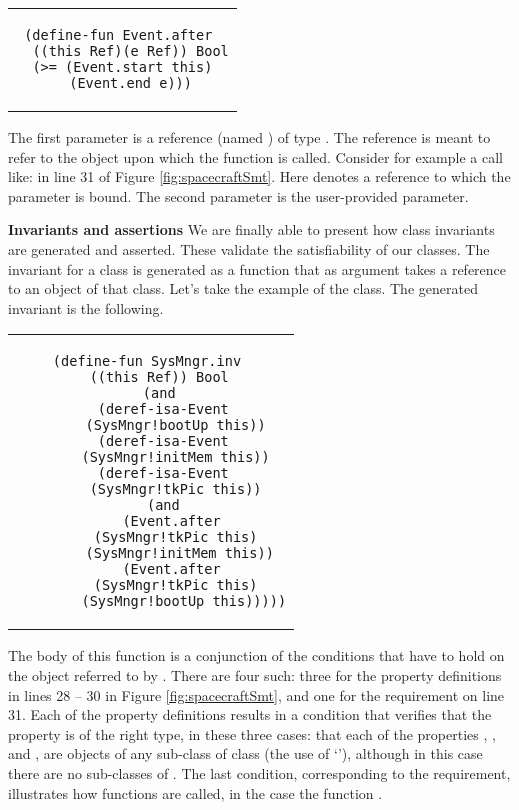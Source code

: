 \begin{center}
\begin{tabular}{c}
\small
\begin{lstlisting}
(define-fun Event.after 
  ((this Ref)(e Ref)) Bool
  (>= (Event.start this)  
  (Event.end e)))
\end{lstlisting}
\end{tabular}
\end{center}

\noindent The first parameter is a reference (named ) of
type . The  reference is meant to refer to the
object upon which the function is called. Consider for example a call
like:  in line 31 of Figure
\ref{fig:spacecraftSmt}. Here  denotes a reference
to which the parameter  is bound.  The second parameter is
the user-provided parameter.


\textbf{Invariants and assertions} We are finally able to present how
class invariants are generated and asserted. These validate the
satisfiability of our classes.  The invariant for a class is generated
as a function that as argument takes a  reference to an
object of that class. Let's take the example of the
 class. The generated invariant is the following.

\begin{center}
\begin{tabular}{c}
\small
\begin{lstlisting}
(define-fun SysMngr.inv 
  ((this Ref)) Bool
  (and
    (deref-isa-Event 
      (SysMngr!bootUp this))
    (deref-isa-Event 
      (SysMngr!initMem this))
    (deref-isa-Event 
      (SysMngr!tkPic this))
    (and 
      (Event.after 
        (SysMngr!tkPic this)  
        (SysMngr!initMem this)) 
      (Event.after 
        (SysMngr!tkPic this)  
        (SysMngr!bootUp this)))))
\end{lstlisting}
\end{tabular}
\end{center}

\noindent The body of this function is a conjunction of the conditions
that have to hold on the  object referred to by
. There are four such: three for the property definitions
in lines 28 -- 30 in Figure \ref{fig:spacecraftSmt}, and one for the
requirement on line 31. Each of the property definitions results in a
condition that verifies that the property is of the right type, in
these three cases: that each of the properties ,
, and , are objects of any sub-class of
class  (the use of `'), although in this case
there are no sub-classes of . The last condition,
corresponding to the requirement, illustrates how functions are called,
in the case the function .

